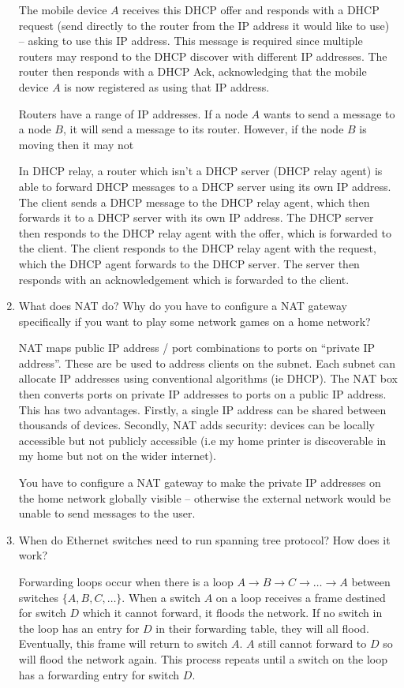 \documentclass[10pt,\jkfside,a4paper]{article}
\begin{document}
\begin{enumerate}
The mobile device $A$ receives this DHCP offer and responds with a DHCP
request (send directly to the router from the IP address it would like to
use) -- asking to use this IP address. This message is required since
multiple routers may respond to the DHCP discover with different IP
addresses. The router then responds with a DHCP Ack, acknowledging that the
mobile device $A$ is now registered as using that IP address.

Routers have a range of IP addresses. If a node $A$ wants to send a message
to a node $B$, it will send a message to its router. However, if the node
$B$ is moving then it may not

In DHCP relay, a router which isn't a DHCP server (DHCP relay agent) is able
to forward DHCP messages to a DHCP server using its own IP address. The
client sends a DHCP message to the DHCP relay agent, which then forwards it
to a DHCP server with its own IP address. The DHCP server then responds
to the DHCP relay agent with the offer, which is forwarded to the client. The
client responds to the DHCP relay agent with the request, which the DHCP
agent forwards to the DHCP server. The server then responds with an
acknowledgement which is forwarded to the client.

\item What does NAT do? Why do you have to configure a NAT gateway
specifically if you want to play some network games on a home network?

NAT maps public IP address / port combinations to ports on ``private IP
address''. These are be used to address clients on the subnet. Each subnet
can allocate IP addresses using conventional algorithms (ie DHCP). The NAT
box then converts ports on private IP addresses to ports on a public IP
address. This has two advantages. Firstly, a single IP address can be
shared between thousands of devices. Secondly, NAT adds security: devices can
be locally accessible but not publicly accessible (i.e my home printer is
discoverable in my home but not on the wider internet).

You have to configure a NAT gateway to make the private IP addresses on the
home network globally visible -- otherwise the external network would be
unable to send messages to the user.

\item When do Ethernet switches need to run spanning tree protocol? How does
it work?

Forwarding loops occur when there is a loop $A \to B \to C \to \dots \to
A$ between switches $\{A, B, C,\dots\}$. When a switch $A$ on a loop
receives a frame destined for switch $D$ which it cannot forward, it
floods the network. If no switch in the loop has an entry for $D$ in their
forwarding table, they will all flood. Eventually, this frame will return
to switch $A$. $A$ still cannot forward to $D$ so will flood the network
again. This process repeats until a switch on the loop has a forwarding
entry for switch $D$.


\end{enumerate}
\end{document}
